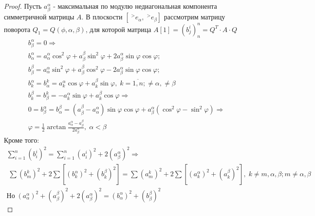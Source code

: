 \documentclass[__main__.tex]{subfiles}
\begin{document}
\begin{proof}
	Пусть $a^\alpha_\beta$ - максимальная по модулю недиагональная компонента симметричной матрицы $A.$ В плоскости $\left[\;^{>}e_\alpha,\;^{>}e_\beta\right]$ рассмотрим матрицу поворота $Q_1=Q(\phi,\alpha,\beta)$, для которой матрица $A[1]=(b^i_j)^n_n = Q^T\cdot A\cdot Q$
	\begin{gather*}
		b^\alpha_\beta = 0 \Rightarrow\\
		b^\alpha_\alpha =a^\alpha_\alpha\cos^2\varphi+a^\beta_\beta\sin^2\varphi+2a^\alpha_\beta\sin\varphi\cos\varphi;\\
		b^\beta_\beta =a^\alpha_\alpha\sin^2\varphi+a^\beta_\beta\cos^2\varphi-2a^\alpha_\beta\sin\varphi\cos\varphi;\\
		b^\alpha_k=b^k_\alpha = a^\alpha_k\cos\varphi+a^\beta_k\sin\varphi,\; k=\overline{1,n};\ne\alpha,\ne\beta\\
		b^\beta_k=b^k_\beta = -a^\alpha_k\sin\varphi+a^\beta_k\cos\varphi\Longrightarrow\\
		0=b^\alpha_\beta=b^\beta_\alpha=(a^\beta_\beta-a^\alpha_\alpha)\sin\varphi\cos\varphi+a^\alpha_\beta(\cos^2\varphi-\sin^2\varphi)\Rightarrow\\
		\varphi=\frac{1}{2}\arctan\frac{a^\alpha_\alpha-a^\beta_\beta}{2a^\alpha_\beta},\; \alpha<\beta
	\end{gather*}
Кроме того:
\begin{gather*}
	\sum\limits_{i=1}^n(b^i_i)^2 = \sum\limits_{i=1}^n(a^i_i)^2+2(a^\alpha_\beta)^2\Rightarrow\\\;\sum(b^k_m)^2+2\sum[(b^\alpha_k)^2+(b^\beta_k)^2]=\sum(a^k_m)^2+2\sum[(a^\alpha_k)^2+(a^\beta_k)^2],\;k\ne m,\alpha,\beta;m\ne\alpha,\beta\\
	Но\;(a^\alpha_\alpha)^2+(a^\beta_\beta)^2+2(a^\alpha_\beta)^2=(b^\alpha_\alpha)^2+(b^\beta_\beta)^2
\end{gather*}
\end{proof} 
\end{document}
